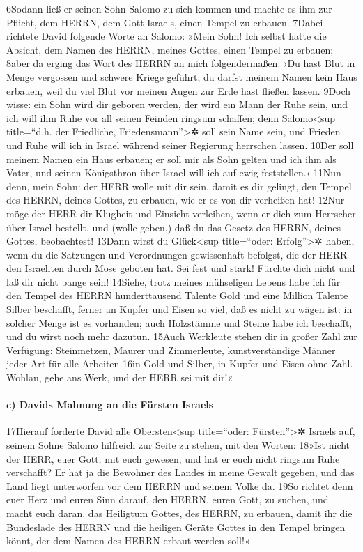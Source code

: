 6Sodann ließ er seinen Sohn Salomo zu sich kommen und machte es ihm zur
Pflicht, dem HERRN, dem Gott Israels, einen Tempel zu erbauen. 7Dabei
richtete David folgende Worte an Salomo: »Mein Sohn! Ich selbst hatte
die Absicht, dem Namen des HERRN, meines Gottes, einen Tempel zu
erbauen; 8aber da erging das Wort des HERRN an mich folgendermaßen: ›Du
hast Blut in Menge vergossen und schwere Kriege geführt; du darfst
meinem Namen kein Haus erbauen, weil du viel Blut vor meinen Augen zur
Erde hast fließen lassen. 9Doch wisse: ein Sohn wird dir geboren werden,
der wird ein Mann der Ruhe sein, und ich will ihm Ruhe vor all seinen
Feinden ringsum schaffen; denn Salomo\textless sup title=``d.h. der
Friedliche, Friedensmann''\textgreater✲ soll sein Name sein, und Frieden
und Ruhe will ich in Israel während seiner Regierung herrschen lassen.
10Der soll meinem Namen ein Haus erbauen; er soll mir als Sohn gelten
und ich ihm als Vater, und seinen Königsthron über Israel will ich auf
ewig feststellen.‹ 11Nun denn, mein Sohn: der HERR wolle mit dir sein,
damit es dir gelingt, den Tempel des HERRN, deines Gottes, zu erbauen,
wie er es von dir verheißen hat! 12Nur möge der HERR dir Klugheit und
Einsicht verleihen, wenn er dich zum Herrscher über Israel bestellt, und
(wolle geben,) daß du das Gesetz des HERRN, deines Gottes, beobachtest!
13Dann wirst du Glück\textless sup title=``oder: Erfolg''\textgreater✲
haben, wenn du die Satzungen und Verordnungen gewissenhaft befolgst, die
der HERR den Israeliten durch Mose geboten hat. Sei fest und stark!
Fürchte dich nicht und laß dir nicht bange sein! 14Siehe, trotz meines
mühseligen Lebens habe ich für den Tempel des HERRN hunderttausend
Talente Gold und eine Million Talente Silber beschafft, ferner an Kupfer
und Eisen so viel, daß es nicht zu wägen ist: in solcher Menge ist es
vorhanden; auch Holzstämme und Steine habe ich beschafft, und du wirst
noch mehr dazutun. 15Auch Werkleute stehen dir in großer Zahl zur
Verfügung: Steinmetzen, Maurer und Zimmerleute, kunstverständige Männer
jeder Art für alle Arbeiten 16in Gold und Silber, in Kupfer und Eisen
ohne Zahl. Wohlan, gehe ans Werk, und der HERR sei mit dir!«

\hypertarget{c-davids-mahnung-an-die-fuxfcrsten-israels}{%
\paragraph{c) Davids Mahnung an die Fürsten
Israels}\label{c-davids-mahnung-an-die-fuxfcrsten-israels}}

17Hierauf forderte David alle Obersten\textless sup title=``oder:
Fürsten''\textgreater✲ Israels auf, seinem Sohne Salomo hilfreich zur
Seite zu stehen, mit den Worten: 18»Ist nicht der HERR, euer Gott, mit
euch gewesen, und hat er euch nicht ringsum Ruhe verschafft? Er hat ja
die Bewohner des Landes in meine Gewalt gegeben, und das Land liegt
unterworfen vor dem HERRN und seinem Volke da. 19So richtet denn euer
Herz und euren Sinn darauf, den HERRN, euren Gott, zu suchen, und macht
euch daran, das Heiligtum Gottes, des HERRN, zu erbauen, damit ihr die
Bundeslade des HERRN und die heiligen Geräte Gottes in den Tempel
bringen könnt, der dem Namen des HERRN erbaut werden soll!«


